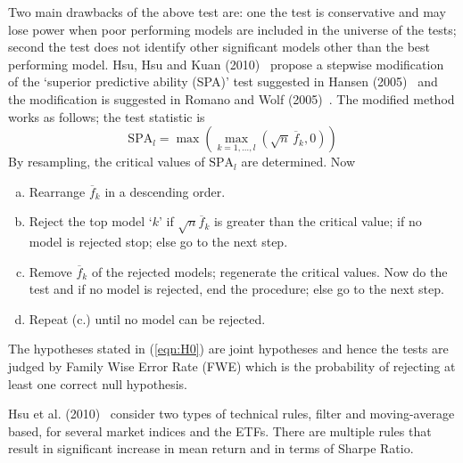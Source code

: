 Two main drawbacks of the above test are: one the test is conservative and may lose power when poor performing models are included in the universe of the tests; second the test does not identify other significant models other than the best performing model. Hsu, Hsu and Kuan (2010)~\cite{hsukuan2010} propose a stepwise modification of the `superior predictive ability (SPA)' test suggested in Hansen (2005)~\cite{hansen2005} and the modification is suggested in Romano and Wolf (2005)~\cite{romano2005}. The modified method works as follows; the test statistic is
	\begin{equation}\label{eqn:SPA}
	\text{SPA}_l = \max(\max_{k=1,\ldots,l} (\sqrt{n}\, \overline{f}_k, 0 ))
	\end{equation}
By resampling, the critical values of $\text{SPA}_l$ are determined. Now
\begin{enumerate}[a.]
\item Rearrange $\overline{f}_k$ in a descending order.

\item Reject the top model `$k$' if $\sqrt{n}\overline{f}_k$ is greater than the critical value; if no model is rejected stop; else go to the next step.

\item Remove $\overline{f}_k$ of the rejected models; regenerate the critical values. Now do the test and if no model is rejected, end the procedure; else go to the next step.

\item Repeat (c.) until no model can be rejected.
\end{enumerate}


The hypotheses stated in (\ref{eqn:H0}) are joint hypotheses and hence the tests are judged by Family Wise Error Rate (FWE) which is the probability of rejecting at least one correct null hypothesis.


Hsu et al. (2010)~\cite{hsukuan2010} consider two types of technical rules, filter and moving-average based, for several market indices and the ETFs. There are multiple rules that result in significant increase in mean return and in terms of Sharpe Ratio.


